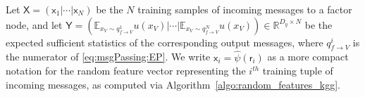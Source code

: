 \documentclass[english]{article}
\theoremstyle{plain}
\theoremstyle{plain}
\newcommand{\factor}{f}				%
\newcommand{\outV}{V}                         %
\newcommand{\agnote}[1]{}
\begin{document}
%

Let $\mathsf{X}=\left(\mathsf{x}_{1}|\cdots|\mathsf{x}_{N}\right)$
be the $N$ training samples of incoming messages to a factor node, and let
$\mathsf{Y}=\left(\mathbb{E}_{x_V \sim q_{\factor\rightarrow
\outV}^{1}}u(x_{\outV})|\cdots|\mathbb{E}_{x_V \sim q_{f\rightarrow
\outV}^{N}}u(x_{\outV})\right)\in\mathbb{R}^{D_{y}\times N}$
be the expected sufficient statistics of the corresponding  output messages, 
where $q^i_{\factor \rightarrow \outV}$ is the numerator 
of \eqref{eq:msgPassing:EP}.
We write $\mathsf{x}_{i}= \hat{\psi}(\mathsf{r}_i)$
as a more compact notation for the random feature
vector representing the $i^{th}$ training tuple of incoming messages,
as computed via Algorithm~\ref{algo:random_features_kgg}. 


\end{document}
